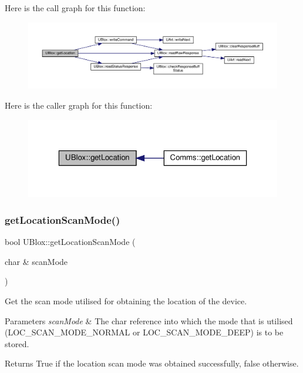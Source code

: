 Here is the call graph for this function\+:\nopagebreak
\begin{figure}[H]
\begin{center}
\leavevmode
\includegraphics[width=350pt]{da/df6/class_u_blox_a2443d175bbf55a4f4facc5d8a99d2723_cgraph}
\end{center}
\end{figure}
Here is the caller graph for this function\+:\nopagebreak
\begin{figure}[H]
\begin{center}
\leavevmode
\includegraphics[width=323pt]{da/df6/class_u_blox_a2443d175bbf55a4f4facc5d8a99d2723_icgraph}
\end{center}
\end{figure}
\mbox{\label{class_u_blox_a398db4cdc2d5356fb86b3cd1021bad1b}} 
\subsubsection{\texorpdfstring{get\+Location\+Scan\+Mode()}{getLocationScanMode()}}
{\footnotesize\ttfamily bool U\+Blox\+::get\+Location\+Scan\+Mode (\begin{DoxyParamCaption}\item[{char \&}]{scan\+Mode }\end{DoxyParamCaption})}

Get the scan mode utilised for obtaining the location of the device.


\begin{DoxyParams}{Parameters}
{\em scan\+Mode} & The char reference into which the mode that is utilised (L\+O\+C\+\_\+\+S\+C\+A\+N\+\_\+\+M\+O\+D\+E\+\_\+\+N\+O\+R\+M\+AL or L\+O\+C\+\_\+\+S\+C\+A\+N\+\_\+\+M\+O\+D\+E\+\_\+\+D\+E\+EP) is to be stored. \\
\hline
\end{DoxyParams}
\begin{DoxyReturn}{Returns}
True if the location scan mode was obtained successfully, false otherwise. 
\end{DoxyReturn}


